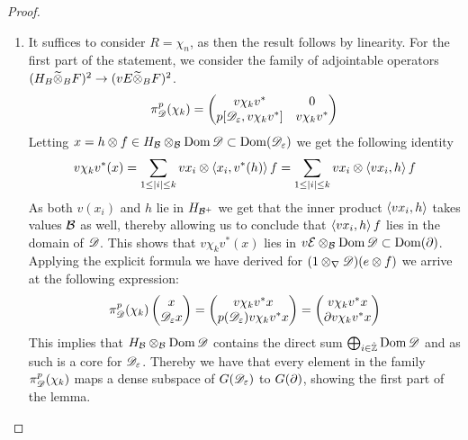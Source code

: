 \begin{proof}
\begin{enumerate}
\item
	It suffices to consider $R=\chi_n$, as then the result follows by linearity. For the first part of the statement, we consider the family of adjointable operators $(H_B\widetilde{\otimes}_B F)^2\to (vE\widetilde{\otimes}_B F)^2$.
	\begin{align*}
		\pi_{\mathscr{D}}^p(\chi_k)=\begin{pmatrix} v\chi_k v^* & 0 \\ p[\mathscr{D}_\varepsilon,v\chi_k v^*] & v\chi_k v^* \end{pmatrix}
	\end{align*}
	Letting $x=h\otimes f \in H_{\mathcal{B}} \otimes_{\mathcal{B}} \operatorname{Dom} \mathscr{D}\subset \operatorname{Dom} (\mathscr{D}_\varepsilon)$ we get the following identity 
	\begin{align*}
		v\chi_k v^*(x)=\sum_{1\leq |i| \leq k}  v x_i \otimes \left \langle x_i,v^*(h) \right \rangle f=\sum_{1 \leq |i| \leq k} v x_i \otimes \left \langle vx_i,h \right \rangle f 
	\end{align*}
	As both $v(x_i)$ and $h$ lie in $H_{\mathcal{B}^+}$ we get that the inner product $\left \langle vx_i,h \right \rangle$ takes values $\mathcal{B}$ as well, thereby allowing us to conclude that $\left \langle v x_i,h \right \rangle f$ lies in the domain of $\mathscr{D}$. This shows that $v\chi_k v^*(x)$ lies in $v\mathcal{E}\otimes_{\mathcal{B}} \operatorname{Dom} \mathscr{D}\subset \operatorname{Dom} (\partial)$. Applying the explicit formula we have derived for $(1\otimes_\nabla \mathscr{D})(e\otimes f)$ we arrive at the following expression:
	\begin{align*}
		\pi_{\mathscr{D}}^p(\chi_k)\begin{pmatrix} x \\ \mathscr{D}_\varepsilon x \end{pmatrix}=\begin{pmatrix}v\chi_k v^* x \\ p(\mathscr{D}_\varepsilon)v\chi_k v^* x \end{pmatrix} = \begin{pmatrix}v\chi_k v^* x \\  \partial v\chi_k v^* x \end{pmatrix}
	\end{align*}
	This implies that $H_{\mathcal{B}} \otimes_{\mathcal{B}} \operatorname{Dom} \mathscr{D}$ contains the direct sum $\bigoplus_{i\in\hat{\mathbb{Z}}} \operatorname{Dom} \mathscr{D}$ and as such is a core for $\mathscr{D}_\varepsilon$. 
	Thereby we have that every element in the family $\pi_{\mathscr{D}}^p(\chi_k)$ maps a dense subspace of $G(\mathscr{D}_\varepsilon)$ to $G(\partial)$, showing the first part of the lemma. 

\end{enumerate}
\end{proof}
